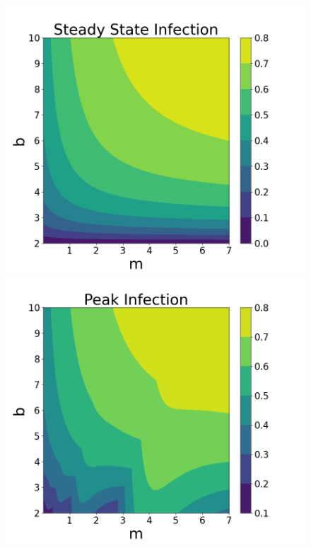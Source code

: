 \documentclass[12pt, reqno]{amsart}
\begin{document}
    \begin{figure}[h]
        \centering
        \begin{minipage}[b]{0.35 \textwidth}
            \includegraphics[width=\textwidth]{./sirs_variation/sirs_ode_infection_steadystate.png}
            \caption{}
            \label{fig:sirs_ode_steady_state}
        \end{minipage}
        \hfill
        \begin{minipage}[b]{0.35 \textwidth}
            \includegraphics[width=\textwidth]{./sirs_variation/sirs_ode_peak_infection.png}
            \caption{}
            \label{fig:sirs_peak_infection}
        \end{minipage}
    \end{figure}
\end{document}
